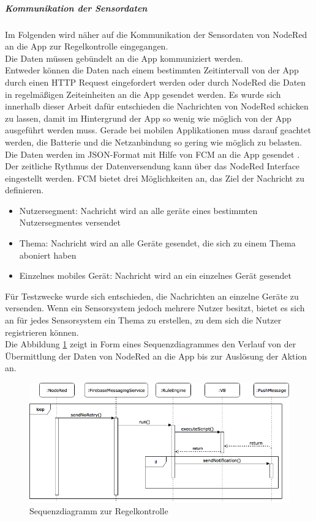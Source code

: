 \subparagraph{Kommunikation der Sensordaten}
Im Folgenden wird näher auf die Kommunikation der Sensordaten von NodeRed an die App zur Regelkontrolle eingegangen.\\
Die Daten müssen gebündelt an die App kommuniziert werden.\\
Entweder können die Daten nach einem bestimmten Zeitintervall von der App durch einen HTTP Request eingefordert werden oder durch NodeRed die Daten in regelmäßigen Zeiteinheiten an die App gesendet werden. Es wurde sich innerhalb dieser Arbeit dafür entschieden die Nachrichten von NodeRed schicken zu lassen, damit im Hintergrund der App so wenig wie möglich von der App ausgeführt werden muss. Gerade bei mobilen Applikationen muss darauf geachtet werden, die Batterie und die Netzanbindung so gering wie möglich zu belasten. \\
Die Daten werden im JSON-Format mit Hilfe von \ac{FCM} an die App gesendet \cite{firebase:gcm}. Der zeitliche Rythmus der Datenversendung kann über das NodeRed Interface eingestellt werden. \ac{FCM} bietet drei Möglichkeiten an, das Ziel der Nachricht zu definieren.
\begin{itemize}
	\item Nutzersegment: Nachricht wird an alle geräte eines bestimmten Nutzersegmentes versendet
	\item Thema: Nachricht wird an alle Geräte gesendet, die sich zu einem Thema aboniert haben
	\item Einzelnes mobiles Gerät: Nachricht wird an ein einzelnes Gerät gesendet
\end{itemize}
Für Testzwecke wurde sich entschieden, die Nachrichten an einzelne Geräte zu versenden. Wenn ein Sensorsystem jedoch mehrere Nutzer besitzt, bietet es sich an für jedes Sensorsystem ein Thema zu erstellen, zu dem sich die Nutzer registrieren können.\\
Die Abbildung \ref{fig:sequenzdiagramm} zeigt in Form eines Sequenzdiagrammes den Verlauf von der Übermittlung
der Daten von NodeRed an die App bis zur Auslösung der Aktion an.
\begin{figure}
	\centering
	\includegraphics[width=1\textwidth]{images/Sequenzdiagramm.png}
	\caption{Sequenzdiagramm zur Regelkontrolle}
	\label{fig:sequenzdiagramm}
\end{figure}

